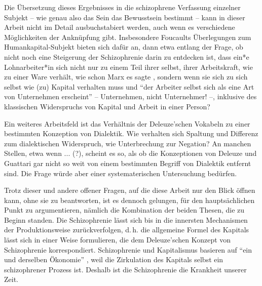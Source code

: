 \documentclass[12pt,
               paper=a4,
               twoside=false,
               onehalfspacing,
               bibliography=totoc,
               toc=graduated,
               ]{scrartcl}
\newcommand{\pc}[2]{\parencite[#1]{#2}}
\newcommand{\vgl}[2]{\parencite[vgl.][#1]{#2}}
\begin{document}
Die Übersetzung dieses Ergebnisses in die schizophrene Verfassung
einzelner Subjekt -- wie genau also das Sein das Bewusstsein bestimmt
-- kann in dieser Arbeit nicht im Detail ausbuchstabiert werden, auch
wenn es verschiedene Möglichkeiten der Anknüpfung gibt. Insbesondere
Foucaults Überlegungen zum Humankapital-Subjekt bieten sich dafür an,
dann etwa entlang der Frage, ob nicht noch eine Steigerung der
Schizophrenie darin zu entdecken ist, dass ein*e Lohnarbeiter*in sich
nicht nur zu einem Teil ihrer selbst, ihrer Arbeitskraft, wie zu einer
Ware verhält, wie schon Marx es sagte \vgl{182}{kap}, sondern wenn sie
sich zu sich selbst wie (zu) Kapital verhalten muss und "`der Arbeiter
selbst sich als eine Art von Unternehmen erscheint"' \pc{313}{gbp} --
Unternehmen, nicht Unternehmer! --, inklusive des klassischen
Widerspruchs von Kapital und Arbeit in einer Person?

Ein weiteres Arbeitsfeld ist das Verhältnis der Deleuze'schen Vokabeln
zu einer bestimmten Konzeption von Dialektik. Wie verhalten sich
Spaltung und Differenz zum dialektischen Widerspruch, wie
Unterbrechung zur Negation? An manchen Stellen, etwa wenn ... (?), scheint
es so, als ob die Konzeptionen von Deleuze und Guattari gar nicht so
weit von einem bestimmten Begriff von Dialektik entfernt sind. Die
Frage würde aber einer systematerischen Untersuchung bedürfen.

Trotz dieser und andere offener Fragen, auf die diese Arbeit nur den
Blick öffnen kann, ohne sie zu beantworten, ist es dennoch gelungen,
für den hauptsächlichen Punkt zu argumentieren, nämlich die
Kombination der beiden Thesen, die zu Beginn standen. Die
Schizophrenie lässt sich bis in die innersten Mechanismen der
Produktionsweise zurückverfolgen, d.\,h. die allgemeine Formel des
Kapitals lässt sich in einer Weise formulieren, die dem Deleuze'schen
Konzept von Schizophrenie korrespondiert. Schizophrenie und
Kapitalismus basieren auf "`ein und derselben Ökonomie"' \pc{315}{ao},
weil die Zirkulation des Kapitals selbst ein schizophrener Prozess
ist. Deshalb ist die Schizophrenie die Krankheit unserer Zeit.

%
%
%
%
%
%
%
\end{document}
